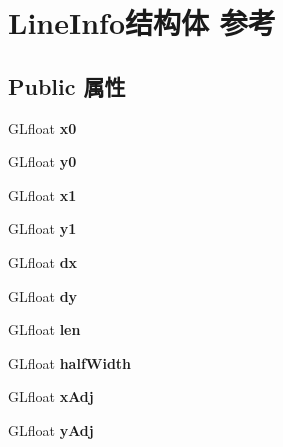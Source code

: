 \hypertarget{struct_line_info}{}\section{Line\+Info结构体 参考}
\label{struct_line_info}
\subsection*{Public 属性}
\begin{DoxyCompactItemize}
\item 
\mbox{\label{struct_line_info_a47607261b538a349aed7aea6e67da3dd}} 
G\+Lfloat {\bfseries x0}
\item 
\mbox{\label{struct_line_info_a0919bfeb5e22d879591fb5705b8594d4}} 
G\+Lfloat {\bfseries y0}
\item 
\mbox{\label{struct_line_info_a8cc81faa0a30cbd2560711b263e0138a}} 
G\+Lfloat {\bfseries x1}
\item 
\mbox{\label{struct_line_info_adb0b02011fdf52ca3ab4d322adf39e7d}} 
G\+Lfloat {\bfseries y1}
\item 
\mbox{\label{struct_line_info_a6ee3bb92525739b6a493401c258bc1f8}} 
G\+Lfloat {\bfseries dx}
\item 
\mbox{\label{struct_line_info_ac298efab72b38b3dadc777afc262ec3d}} 
G\+Lfloat {\bfseries dy}
\item 
\mbox{\label{struct_line_info_a4572257dff6e37860b55f6a43e2122e5}} 
G\+Lfloat {\bfseries len}
\item 
\mbox{\label{struct_line_info_a52f2dbff634aac93f90ce881051bb594}} 
G\+Lfloat {\bfseries half\+Width}
\item 
\mbox{\label{struct_line_info_a2457c6e3d900a616c593713ec813293f}} 
G\+Lfloat {\bfseries x\+Adj}
\item 
\mbox{\label{struct_line_info_a742f7e596716a7ee9e4057d8e52e38fc}} 
G\+Lfloat {\bfseries y\+Adj}
\item 

\end{DoxyCompactItemize}
